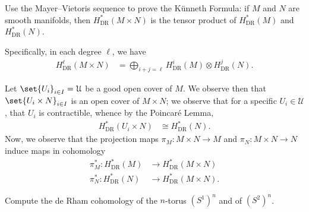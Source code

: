 \documentclass[10pt]{mypackage}
\begin{document}
\begin{problem}[Problem 5]
  Use the Mayer--Vietoris sequence to prove the Künneth Formula: if $M$ and $N$ are smooth manifolds, then $H^{\ast}_{\operatorname{DR}}\left( M\times N \right)$ is the tensor product of $H^{\ast}_{\operatorname{DR}}\left( M \right)$ and $H^{\ast}_{\operatorname{DR}}\left( N \right)$.\newline

  Specifically, in each degree $\ell$, we have
  \begin{align*}
    H^{\ell}_{\operatorname{DR}}\left( M\times N \right) &= \bigoplus_{i + j = \ell} H^{i}_{\operatorname{DR}}\left( M \right)\otimes H^{j}_{\operatorname{DR}}\left( N \right).
  \end{align*}
\end{problem}
\begin{solution}
  Let $\set{U_i}_{i\in I} = \mathcal{U}$ be a good open cover of $M$. We observe then that $\set{U_i\times N}_{i\in I}$ is an open cover of $M\times N$; we observe that for a specific $U_i\in \mathcal{U}$, that $U_i$ is contractible, whence by the Poincaré Lemma,
  \begin{align*}
    H^{\ast}_{\operatorname{DR}}\left( U_i\times N \right) &\cong H^{\ast}_{\operatorname{DR}}\left( N \right).
  \end{align*}
  Now, we observe that the projection maps $\pi_M\colon M\times N\rightarrow M$ and $\pi_N\colon M\times N\rightarrow N$ induce maps in cohomology
  \begin{align*}
    \pi_M^{\ast}\colon H^{\ast}_{\operatorname{DR}}\left( M \right) &\rightarrow H^{\ast}_{\operatorname{DR}}\left( M\times N \right)\\
    \pi_N^{\ast}\colon H^{\ast}_{\operatorname{DR}} \left( N \right) &\rightarrow H^{\ast}_{\operatorname{DR}} \left( M\times N \right).
  \end{align*}
\end{solution}
\begin{problem}[Problem 6]
  Compute the de Rham cohomology of the $n$-torus $\left( S^{1} \right)^{n}$ and of $\left( S^{2} \right)^{n}$.
\end{problem}
\end{document}
